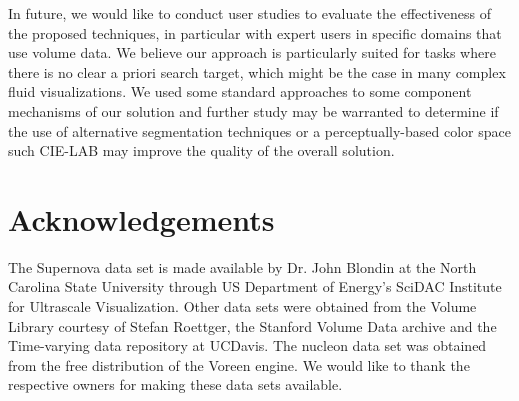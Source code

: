 \documentclass[twoside,twocolumn,10pt]{article}
\begin{document}
In future, we would like to conduct user studies to evaluate the effectiveness of the proposed techniques, in particular with expert users in specific domains that use volume data. We believe our approach is particularly suited for tasks where there is no clear a priori search target, which might be the case in many complex fluid visualizations. We used some standard approaches to some component mechanisms of our solution and further study may be warranted to determine if the use of alternative segmentation techniques or a perceptually-based color space such CIE-LAB may improve the quality of the overall solution.

\section{Acknowledgements}


The Supernova data set is made available by Dr. John Blondin at the North Carolina State University through US Department of Energy's SciDAC Institute for Ultrascale Visualization. Other data sets were obtained from the Volume Library courtesy of Stefan Roettger, the Stanford Volume Data archive and the Time-varying data repository at UCDavis. The nucleon data set was obtained from the free distribution of the Voreen engine. We would like to thank the respective owners for making these data sets available.


%
%
\end{document}

